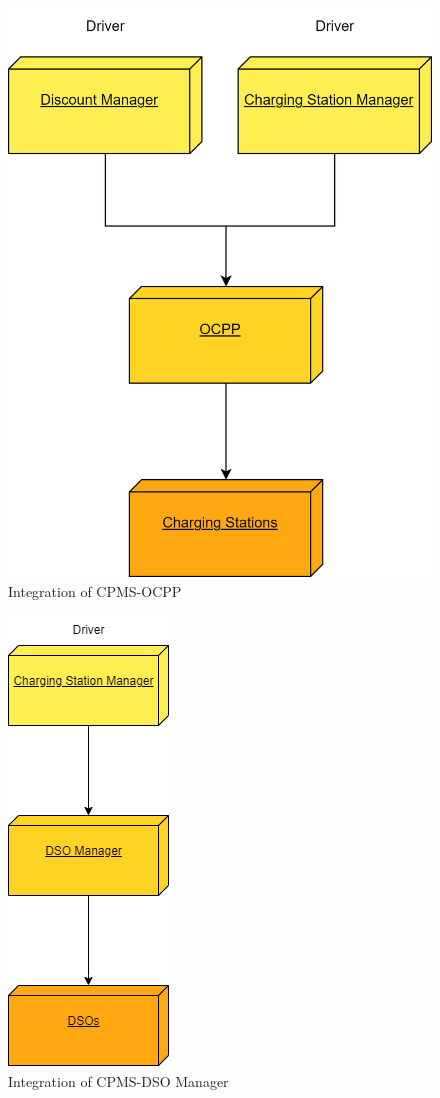 \documentclass[table, 12pt]{article}
\begin{document}
\begin{figure}[H]
    \centering
    \includegraphics[scale=0.6]{assets/Integration Diagrams/CPMS-OCPP.png} 
    \caption{Integration of CPMS-OCPP}%
    \label{fig: CPMS-OCPP}%
\end{figure}

\begin{figure}[H]
    \centering
    \includegraphics[scale=0.6]{assets/Integration Diagrams/CPMS-DSO Manager.png} 
    \caption{Integration of CPMS-DSO Manager}%
    \label{fig: CPMS-DSO Manager}%
\end{figure}
\end{document}
